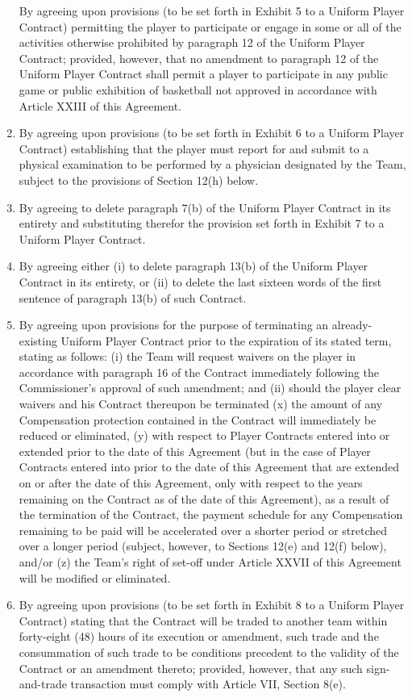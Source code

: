 \documentclass[
]{book}
\begin{document}
\begin{enumerate}
  By agreeing upon provisions (to be set forth in Exhibit 5 to a Uniform Player Contract) permitting the player to participate or engage in some or all of the activities otherwise prohibited by paragraph 12 of the Uniform Player Contract; provided, however, that no amendment to paragraph 12 of the Uniform Player Contract shall permit a player to participate in any public game or public exhibition of basketball not approved in accordance with Article XXIII of this Agreement.
\item
  By agreeing upon provisions (to be set forth in Exhibit 6 to a Uniform Player Contract) establishing that the player must report for and submit to a physical examination to be performed by a physician designated by the Team, subject to the provisions of Section 12(h) below.
\item
  By agreeing to delete paragraph 7(b) of the Uniform Player Contract in its entirety and substituting therefor the provision set forth in Exhibit 7 to a Uniform Player Contract.
\item
  By agreeing either (i) to delete paragraph 13(b) of the Uniform Player Contract in its entirety, or (ii) to delete the last sixteen words of the first sentence of paragraph 13(b) of such Contract.
\item
  By agreeing upon provisions for the purpose of terminating an already-existing Uniform Player Contract prior to the expiration of its stated term, stating as follows: (i) the Team will request waivers on the player in accordance with paragraph 16 of the Contract immediately following the Commissioner's approval of such amendment; and (ii) should the player clear waivers and his Contract thereupon be terminated (x) the amount of any Compensation protection contained in the Contract will immediately be reduced or eliminated, (y) with respect to Player Contracts entered into or extended prior to the date of this Agreement (but in the case of Player Contracts entered into prior to the date of this Agreement that are extended on or after the date of this Agreement, only with respect to the years remaining on the Contract as of the date of this Agreement), as a result of the termination of the Contract, the payment schedule for any Compensation remaining to be paid will be accelerated over a shorter period or stretched over a longer period (subject, however, to Sections 12(e) and 12(f) below), and/or (z) the Team's right of set-off under Article XXVII of this Agreement will be modified or eliminated.
\item
  By agreeing upon provisions (to be set forth in Exhibit 8 to a Uniform Player Contract) stating that the Contract will be traded to another team within forty-eight (48) hours of its execution or amendment, such trade and the consummation of such trade to be conditions precedent to the validity of the Contract or an amendment thereto; provided, however, that any such sign-and-trade transaction must comply with Article VII, Section 8(e).

\end{enumerate}
\end{document}
